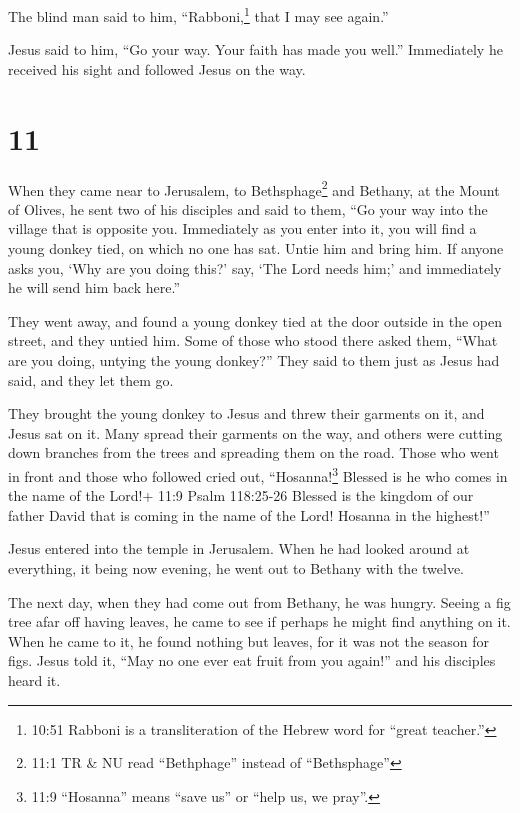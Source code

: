 The blind man said to him, ``Rabboni,\footnote{10:51 Rabboni is a
  transliteration of the Hebrew word for ``great teacher.''} that I may
see again.''

 Jesus said to him, ``Go your way. Your faith has made you
well.'' Immediately he received his sight and followed Jesus on the way.

\hypertarget{section-10}{%
\section{11}\label{section-10}}

 When they came near to Jerusalem, to Bethsphage\footnote{11:1
  TR \& NU read ``Bethphage'' instead of ``Bethsphage''} and Bethany, at
the Mount of Olives, he sent two of his disciples  and said
to them, ``Go your way into the village that is opposite you.
Immediately as you enter into it, you will find a young donkey tied, on
which no one has sat. Untie him and bring him.  If anyone
asks you, `Why are you doing this?' say, `The Lord needs him;' and
immediately he will send him back here.''

 They went away, and found a young donkey tied at the door
outside in the open street, and they untied him.  Some of
those who stood there asked them, ``What are you doing, untying the
young donkey?''  They said to them just as Jesus had said,
and they let them go.

 They brought the young donkey to Jesus and threw their
garments on it, and Jesus sat on it.  Many spread their
garments on the way, and others were cutting down branches from the
trees and spreading them on the road.  Those who went in
front and those who followed cried out, ``Hosanna!\footnote{11:9
  ``Hosanna'' means ``save us'' or ``help us, we pray''.} Blessed is he
who comes in the name of the Lord!+ 11:9 Psalm 118:25-26 
Blessed is the kingdom of our father David that is coming in the name of
the Lord! Hosanna in the highest!''

 Jesus entered into the temple in Jerusalem. When he had
looked around at everything, it being now evening, he went out to
Bethany with the twelve.

 The next day, when they had come out from Bethany, he was
hungry.  Seeing a fig tree afar off having leaves, he came
to see if perhaps he might find anything on it. When he came to it, he
found nothing but leaves, for it was not the season for figs.
 Jesus told it, ``May no one ever eat fruit from you
again!'' and his disciples heard it.

